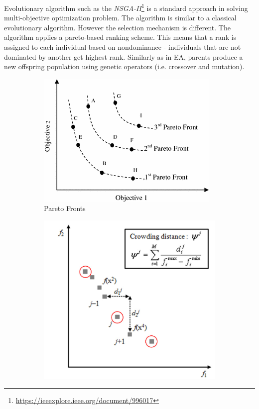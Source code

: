 \documentclass[format=acmsmall, review=false, screen=true]{acmart}
\begin{document}
Evolutionary algorithm such as the \emph{NSGA-II}\footnote{\url{https://ieeexplore.ieee.org/document/996017}} is a standard approach in solving multi-objective optimization problem. The algorithm is similar to a classical evolutionary algorithm. However the selection mechanism is different. The algorithm applies a pareto-based ranking scheme. This means that a rank is assigned to each individual based on nondominance - individuals that are not dominated by another get highest rank. Similarly as in EA, parents produce a new offspring population using genetic operators (i.e. crossover and mutation).

\begin{figure}[H]
  \centering
  \begin{subfigure}[t]{0.55\textwidth}
    \includegraphics[width=\textwidth]{img/pareto_fronts.PNG}
    \caption{\label{fig:fronts}Pareto Fronts}
  \end{subfigure}
  \hfill
  \begin{subfigure}[t]{0.43\textwidth}
    \includegraphics[width=\textwidth]{img/crowding_distance.JPEG}

\end{subfigure}
\end{figure}
\end{document}
